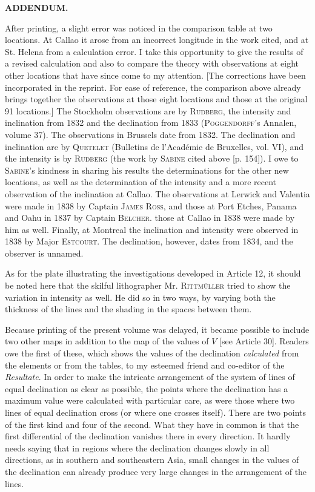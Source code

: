 \begin{center}\large\bfseries ADDENDUM.\end{center}
After printing, a slight error was noticed in the comparison table at two locations. At Callao it arose from an incorrect longitude in the work cited, and at St. Helena from a calculation error. I take this opportunity to give the results of a revised calculation and also to compare the theory with observations at eight other locations that have since come to my attention. [The corrections have been incorporated in the reprint. For ease of reference, the comparison above already brings together the observations at those eight locations and those at the original 91 locations.]
The Stockholm observations are by \textsc{Rudberg}, the intensity and inclination from 1832 and the declination from 1833 (\textsc{Poggendorff}’s Annalen, volume 37). The observations in Brussels date from 1832. The declination and inclination are by \textsc{Quetelet} (Bulletins de l’Académie de Bruxelles, vol. VI), and the intensity is by \textsc{Rudberg} (the work by \textsc{Sabine} cited above [p. 154]). I owe to \textsc{Sabine}’s kindness in sharing his results the determinations for the other new locations, as well as the determination of the intensity and a more recent observation of the inclination at Callao. The observations at Lerwick and Valentia were made in 1838 by Captain \textsc{James Ross}, and those at Port Etches, Panama and Oahu in 1837 by Captain \textsc{Belcher}. those at Callao in 1838 were made by him as well. Finally, at Montreal the inclination and intensity were observed in 1838 by Major \textsc{Estcourt}. The declination, however, dates from 1834, and the observer is unnamed.

As for the plate illustrating the investigations developed in Article 12, it should be noted here that the skilful lithographer Mr. \textsc{Rittmüller} tried to show the variation in intensity as well. He did so in two ways, by varying both the thickness of the lines and the shading in the spaces between them.

Because printing of the present volume was delayed, it became possible to include two other maps in addition to the map of the values of $V$ [see Article 30]. Readers owe the first of these, which shows the values of the declination \textit{calculated} from the elements or from the tables, to my esteemed friend and co-editor of the \textit{Resultate}. In order to make the intricate arrangement of the system of lines of equal declination as clear as possible, the points where the declination has a maximum value were calculated with particular care, as were those where two lines of equal declination cross (or where one crosses itself). There are two points of the first kind and four of the second. What they have in common is that the first differential of the declination vanishes there in every direction. It hardly needs saying that in regions where the declination changes slowly in all directions, as in southern and southeastern Asia, small changes in the values of the declination can already produce very large changes in the arrangement of the lines.
